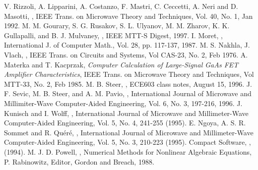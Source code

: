 \begin{thebibliography}{99}
V. Rizzoli, A. Lipparini, A. Costanzo,
F. Mastri, C. Ceccetti, A. Neri and D. Masotti, , \newblock IEEE
Trans. on Microwave Theory and Techniques, Vol. 40, No. 1, Jan 1992.
%
 M. M. Gourary, S. G. Rusakov, S. L. Ulyanov,
M. M. Zharov, K. K. Gullapalli, and B. J. Mulvaney, ,
\newblock IEEE MTT-S Digest, 1997.
%
I. Moret, , \newblock International J. of Computer
Math., Vol. 28, pp. 117-137, 1987.
%
M. S. Nakhla, J. Vlach, , \newblock IEEE Trans. on Circuits and
Systems, Vol CAS-23, No. 2, Feb 1976.
%
A. Materka and T. Kacprzak, \newblock
{\em Computer Calculation of Large-Signal GaAs FET Amplifier
Characteristics}, \newblock IEEE Trans. on Microwave Theory and
Techniques, Vol MTT-33, No. 2, Feb 1985.
%
M. B. Steer, ,
\newblock ECE603 class notes, August 15, 1996.
%
J. F. Sevic, M. B. Steer, and A. M. Pavio,
, \newblock International
Journal of Microwave and Millimiter-Wave Computer-Aided Engineering,
Vol. 6, No. 3, 197-216, 1996.
%
J. Kunisch and I. Wolff, , \newblock International
Journal of Microwave and Millimeter-Wave Computer-Aided Engineering,
Vol. 5, No. 4, 241-255 (1995).
%
E. Ngoya, A. S. R. Sommet and
R. Qu\'er\'e, , \newblock International Journal
of Microwave and Millimeter-Wave Computer-Aided Engineering, Vol. 5,
No. 3, 210-223 (1995).
%
Compact Software, , \newblock (1994).
%
 M. J. D. Powell, , \newblock Numerical Methods for Nonlinear
Algebraic Equations, P. Rabinowitz, Editor, Gordon and Breach, 1988.

\end{thebibliography}
